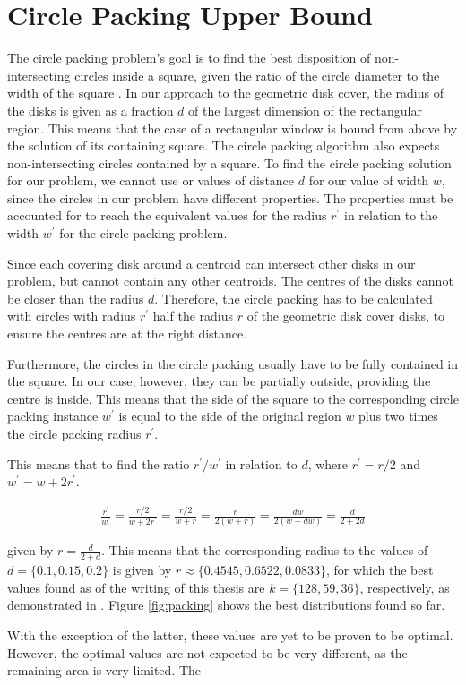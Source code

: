 \section{Circle Packing Upper Bound}
\label{ann:packing}
The circle packing problem's goal is to find the best disposition of non-intersecting circles inside a square, given the ratio of the circle diameter to the width of the square \cite{packing}. In our approach to the geometric disk cover, the radius of the disks is given as a fraction $d$ of the largest dimension of the rectangular region. This means that the case of a rectangular window is bound from above by the solution of its containing square. The circle packing algorithm also expects non-intersecting circles contained by a square. To find the circle packing solution for our problem, we cannot use or values of distance $d$ for our value of width $w$, since the circles in our problem have different properties. The properties must be accounted for to reach the equivalent values for the radius $r^\prime$ in relation to the width $w^\prime$ for the circle packing problem.

Since each covering disk around a centroid can intersect other disks in our problem, but cannot contain any other centroids. The centres of the disks cannot be closer than the radius $d$. Therefore, the circle packing has to be calculated with circles with radius $r^\prime$ half the radius $r$ of the geometric disk cover disks, to ensure the centres are at the right distance. 

Furthermore, the circles in the circle packing usually have to be fully contained in the square. In our case, however, they can be partially outside, providing the centre is inside. This means that the side of the square to the corresponding circle packing instance $w^\prime$ is equal to the side of the original region $w$ plus two times the circle packing radius $r^\prime$.

This means that to find the ratio $r^\prime/w^\prime$ in relation to $d$, where $r^\prime=r/2$ and $w^\prime=w+2r^\prime$.

\begin{align}
	\frac{r^\prime}{w^\prime} = \frac{r/2}{w+2r^\prime} = \frac{r/2}{w+r} = \frac{r}{2(w+r)} = \frac{dw}{2(w+dw)}=\frac{d}{2+2d}
\end{align}

given by $r=\frac{d}{2+d}$. This means that the corresponding radius to the values of $d=\{0.1,0.15,0.2\}$ is given by $r\approx\{0.4545,0.6522,0.0833\}$, for which the best values found as of the writing of this thesis are $k=\{128,59,36\}$, respectively, as demonstrated in \cite{pack1,pack2,pack3}. Figure \ref{fig:packing} shows the best distributions found so far.




With the exception of the latter, these values are yet to be proven to be optimal. However, the optimal values are not expected to be very different, as the remaining area is very limited. The
